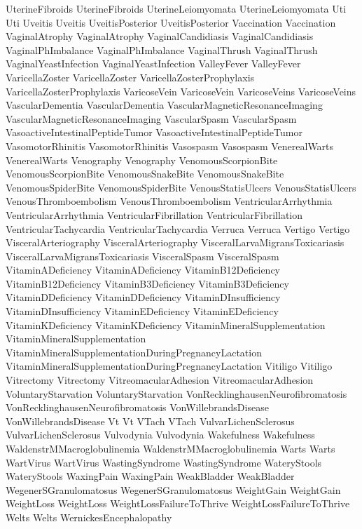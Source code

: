  UterineFibroids
 UterineFibroids
 UterineLeiomyomata
 UterineLeiomyomata
 Uti
 Uti
 Uveitis
 Uveitis
 UveitisPosterior
 UveitisPosterior
 Vaccination
 Vaccination
 VaginalAtrophy
 VaginalAtrophy
 VaginalCandidiasis
 VaginalCandidiasis
 VaginalPhImbalance
 VaginalPhImbalance
 VaginalThrush
 VaginalThrush
 VaginalYeastInfection
 VaginalYeastInfection
 ValleyFever
 ValleyFever
 VaricellaZoster
 VaricellaZoster
 VaricellaZosterProphylaxis
 VaricellaZosterProphylaxis
 VaricoseVein
 VaricoseVein
 VaricoseVeins
 VaricoseVeins
 VascularDementia
 VascularDementia
 VascularMagneticResonanceImaging
 VascularMagneticResonanceImaging
 VascularSpasm
 VascularSpasm
 VasoactiveIntestinalPeptideTumor
 VasoactiveIntestinalPeptideTumor
 VasomotorRhinitis
 VasomotorRhinitis
 Vasospasm
 Vasospasm
 VenerealWarts
 VenerealWarts
 Venography
 Venography
 VenomousScorpionBite
 VenomousScorpionBite
 VenomousSnakeBite
 VenomousSnakeBite
 VenomousSpiderBite
 VenomousSpiderBite
 VenousStatisUlcers
 VenousStatisUlcers
 VenousThromboembolism
 VenousThromboembolism
 VentricularArrhythmia
 VentricularArrhythmia
 VentricularFibrillation
 VentricularFibrillation
 VentricularTachycardia
 VentricularTachycardia
 Verruca
 Verruca
 Vertigo
 Vertigo
 VisceralArteriography
 VisceralArteriography
 VisceralLarvaMigransToxicariasis
 VisceralLarvaMigransToxicariasis
 VisceralSpasm
 VisceralSpasm
 VitaminADeficiency
 VitaminADeficiency
 VitaminB12Deficiency
 VitaminB12Deficiency
 VitaminB3Deficiency
 VitaminB3Deficiency
 VitaminDDeficiency
 VitaminDDeficiency
 VitaminDInsufficiency
 VitaminDInsufficiency
 VitaminEDeficiency
 VitaminEDeficiency
 VitaminKDeficiency
 VitaminKDeficiency
 VitaminMineralSupplementation
 VitaminMineralSupplementation
 VitaminMineralSupplementationDuringPregnancyLactation
 VitaminMineralSupplementationDuringPregnancyLactation
 Vitiligo
 Vitiligo
 Vitrectomy
 Vitrectomy
 VitreomacularAdhesion
 VitreomacularAdhesion
 VoluntaryStarvation
 VoluntaryStarvation
 VonRecklinghausenNeurofibromatosis
 VonRecklinghausenNeurofibromatosis
 VonWillebrandsDisease
 VonWillebrandsDisease
 Vt
 Vt
 VTach
 VTach
 VulvarLichenSclerosus
 VulvarLichenSclerosus
 Vulvodynia
 Vulvodynia
 Wakefulness
 Wakefulness
 WaldenstrMMacroglobulinemia
 WaldenstrMMacroglobulinemia
 Warts
 Warts
 WartVirus
 WartVirus
 WastingSyndrome
 WastingSyndrome
 WateryStools
 WateryStools
 WaxingPain
 WaxingPain
 WeakBladder
 WeakBladder
 WegenerSGranulomatosus
 WegenerSGranulomatosus
 WeightGain
 WeightGain
 WeightLoss
 WeightLoss
 WeightLossFailureToThrive
 WeightLossFailureToThrive
 Welts
 Welts
 WernickesEncephalopathy
